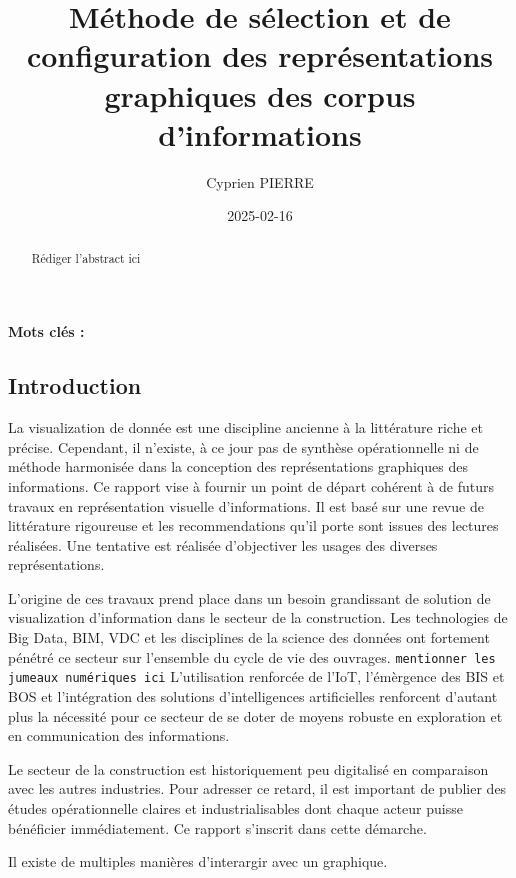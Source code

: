 \documentclass[a4paper,12pt]{article}
\author{Cyprien PIERRE \orcidlink{0009-0009-9040-6795}}
\date{2025-02-16}
\title{Méthode de sélection et de configuration des représentations graphiques des corpus d'informations}
\begin{document}
\maketitle
\begin{abstract}
Rédiger l'abstract ici
\end{abstract}

\renewcommand\{\keywordsname\{\textbf{Mots clés : }

\begin{multicols}{2}
\section*{Introduction}
\label{sec:orgb077e92}
La visualization de donnée est une discipline ancienne à la littérature riche et précise. Cependant, il n'existe, à ce jour pas de synthèse opérationnelle ni de méthode harmonisée dans la conception des représentations graphiques des informations. Ce rapport vise à fournir un point de départ cohérent à de futurs travaux en représentation visuelle d'informations. Il est basé sur une revue de littérature rigoureuse et les recommendations qu'il porte sont issues des lectures réalisées. Une tentative est réalisée d'objectiver les usages des diverses représentations.

L'origine de ces travaux prend place dans un besoin grandissant de solution de visualization d'information dans le secteur de la construction. Les technologies de Big Data, BIM, VDC et les disciplines de la science des données ont fortement pénétré ce secteur sur l'ensemble du cycle de vie des ouvrages. \autocite{asiauniversitytaichungtaiwanResearchApplicationFunctiontechnologyaesthetics2020} \texttt{mentionner les jumeaux numériques ici} L'utilisation renforcée de l'IoT, l'émèrgence des BIS et BOS et l'intégration des solutions d'intelligences artificielles renforcent d'autant plus la nécessité pour ce secteur de se doter de moyens robuste en exploration et en communication des informations.

Le secteur de la construction est historiquement peu digitalisé en comparaison avec les autres industries.\autocite{REF???} Pour adresser ce retard, il est important de publier des études opérationnelle claires et industrialisables dont chaque acteur puisse bénéficier immédiatement. Ce rapport s'inscrit dans cette démarche.

Il existe de multiples manières d'interargir avec un graphique. \autocite{schwabishCenteringAccessibilityData2022a,frankelavskyRightToolsJob2022}


\end{multicols}
\end{document}

